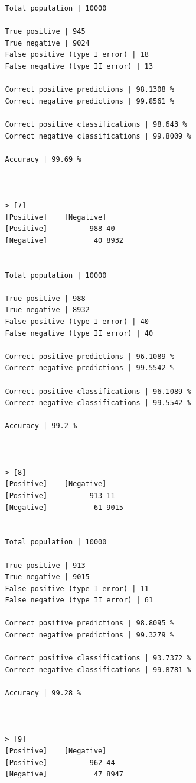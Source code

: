 \documentclass{classrep}
\begin{document}
{{{\begin{lstlisting}
                Total population | 10000

                True positive | 945
                True negative | 9024
                False positive (type I error) | 18
                False negative (type II error) | 13

                Correct positive predictions | 98.1308 %
                Correct negative predictions | 99.8561 %

                Correct positive classifications | 98.643 %
                Correct negative classifications | 99.8009 %

                Accuracy | 99.69 %



                > [7]
                [Positive]    [Negative]
                [Positive]          988 40
                [Negative]           40 8932


                Total population | 10000

                True positive | 988
                True negative | 8932
                False positive (type I error) | 40
                False negative (type II error) | 40

                Correct positive predictions | 96.1089 %
                Correct negative predictions | 99.5542 %

                Correct positive classifications | 96.1089 %
                Correct negative classifications | 99.5542 %

                Accuracy | 99.2 %



                > [8]
                [Positive]    [Negative]
                [Positive]          913 11
                [Negative]           61 9015


                Total population | 10000

                True positive | 913
                True negative | 9015
                False positive (type I error) | 11
                False negative (type II error) | 61

                Correct positive predictions | 98.8095 %
                Correct negative predictions | 99.3279 %

                Correct positive classifications | 93.7372 %
                Correct negative classifications | 99.8781 %

                Accuracy | 99.28 %



                > [9]
                [Positive]    [Negative]
                [Positive]          962 44
                [Negative]           47 8947



\end{lstlisting}}}}
\end{document}
